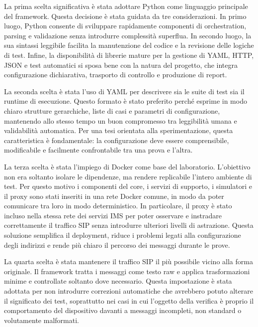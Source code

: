 La prima scelta significativa \`e stata adottare Python come linguaggio principale del framework. Questa decisione \`e stata guidata da tre considerazioni. In primo luogo, Python consente di sviluppare rapidamente componenti di orchestration, parsing e validazione senza introdurre complessit\`a superflua. In secondo luogo, la sua sintassi leggibile facilita la manutenzione del codice e la revisione delle logiche di test. Infine, la disponibilit\`a di librerie mature per la gestione di YAML, HTTP, JSON e test automatici si sposa bene con la natura del progetto, che integra configurazione dichiarativa, trasporto di controllo e produzione di report.

La seconda scelta \`e stata l'uso di YAML per descrivere sia le suite di test sia il runtime di esecuzione. Questo formato \`e stato preferito perch\'e esprime in modo chiaro strutture gerarchiche, liste di casi e parametri di configurazione, mantenendo allo stesso tempo un buon compromesso tra leggibilit\`a umana e validabilit\`a automatica. Per una tesi orientata alla sperimentazione, questa caratteristica \`e fondamentale: la configurazione deve essere comprensibile, modificabile e facilmente confrontabile tra una prova e l'altra.

La terza scelta \`e stata l'impiego di Docker come base del laboratorio. L'obiettivo non era soltanto isolare le dipendenze, ma rendere replicabile l'intero ambiente di test. Per questo motivo i componenti del core, i servizi di supporto, i simulatori e il proxy sono stati inseriti in una rete Docker comune, in modo da poter comunicare tra loro in modo deterministico. In particolare, il proxy \`e stato incluso nella stessa rete dei servizi IMS per poter osservare e instradare correttamente il traffico SIP senza introdurre ulteriori livelli di astrazione. Questa soluzione semplifica il deployment, riduce i problemi legati alla configurazione degli indirizzi e rende pi\`u chiaro il percorso dei messaggi durante le prove.

La quarta scelta \`e stata mantenere il traffico SIP il pi\`u possibile vicino alla forma originale. Il framework tratta i messaggi come testo raw e applica trasformazioni minime e controllate soltanto dove necessario. Questa impostazione \`e stata adottata per non introdurre correzioni automatiche che avrebbero potuto alterare il significato dei test, soprattutto nei casi in cui l'oggetto della verifica \`e proprio il comportamento del dispositivo davanti a messaggi incompleti, non standard o volutamente malformati.


